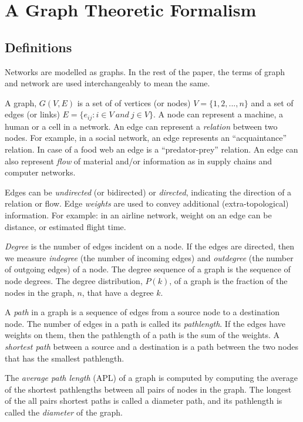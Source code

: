 \documentclass[a4paper,10pt]{article}
\begin{document}
\section{A Graph Theoretic Formalism}

\subsection{Definitions}

Networks are modelled as graphs. In the rest of the paper, the terms of graph and network are used interchangeably to mean the same.

A graph, $G(V, E)$ is a set of of vertices (or nodes) $V = \{1, 2, ..., n\}$ and a set of edges (or links) $E = \{e_{ij}: i \in V\ and\ j \in V\}$. A node can represent a machine, a human or a cell in a network. An edge can represent a \textit{relation} between two nodes. For example, in a social network, an edge represents an ``acquaintance'' relation. In case of a food web an edge is a ``predator-prey'' relation. An edge can also represent \textit{flow} of material and/or information as in supply chains and computer networks.

Edges can be \textit{undirected} (or bidirected) or \textit{directed}, indicating the direction of a relation or flow. Edge \textit{weights} are used to convey additional (extra-topological) information. For example: in an airline network, weight on an edge can be distance, or estimated flight time.

\textit{Degree} is the number of edges incident on a node. If the edges are directed, then we measure \textit{indegree} (the number of incoming edges) and \textit{outdegree} (the number of outgoing edges) of a node. The degree sequence of a graph is the sequence of node degrees. The degree distribution, $P(k)$, of a graph is the fraction of the nodes in the graph, $n$, that have a degree $k$.

A \textit{path} in a graph is a sequence of edges from a source node to a destination node. The number of edges in a path is called its \textit{pathlength}. If the edges have weights on them, then the pathlength of a path is the  sum of the weights. A \textit{shortest path} between a source and a destination is a path between the two nodes that has the smallest pathlength.

The \textit{average path length} (APL) of a graph is computed by computing the average of the shortest pathlengths between all pairs of nodes in the graph. The longest of the all pairs shortest paths is called a diameter path, and its pathlength is called the \textit{diameter} of the graph.
\end{document}
